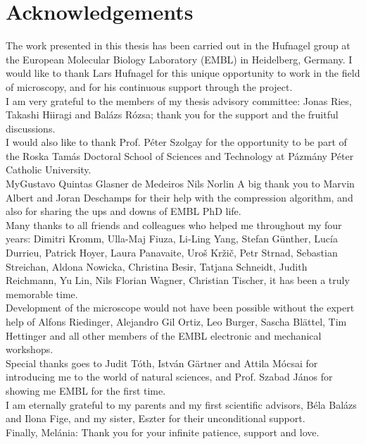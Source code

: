 
\cleardoublepage
\chapter*{Acknowledgements}

The work presented in this thesis has been carried out in the Hufnagel group at the European Molecular Biology Laboratory (EMBL) in Heidelberg, Germany. I would like to thank Lars Hufnagel for this unique opportunity to work in the field of microscopy, and for his continuous support through the project.
\\[1em]
I am very grateful to the members of my thesis advisory committee: Jonas Ries, Takashi Hiiragi and Balázs Rózsa; thank you for the support and the fruitful discussions.
\\[1em]
I would also like to thank Prof. Péter Szolgay for the opportunity to be part of the Roska Tamás Doctoral School of Sciences and Technology at Pázmány Péter Catholic University.
\\[1em]
MyGustavo Quintas Glasner de Medeiros
Nils Norlin
A big thank you to Marvin Albert and Joran Deschamps for their help with the compression algorithm, and also for sharing the ups and downs of EMBL PhD life.
\\[1em]
Many thanks to all friends and colleagues who helped me throughout my four years: 
Dimitri Kromm,
Ulla-Maj Fiuza,
Li-Ling Yang,
Stefan Günther,
Lucía Durrieu,
Patrick Hoyer,
Laura Panavaite,
Uroš Kržič,
Petr Strnad,
Sebastian Streichan,
Aldona Nowicka,
Christina Besir,
Tatjana Schneidt,
Judith Reichmann,
Yu Lin,
Nils Florian Wagner,
Christian Tischer,
it has been a truly memorable time.
\\[1em]
Development of the microscope would not have been possible without the expert help of Alfons Riedinger, Alejandro Gil Ortiz, Leo Burger, Sascha Blättel, Tim Hettinger and all other members of the EMBL electronic and mechanical workshops.
\\[1em]
Special thanks goes to Judit Tóth, István Gärtner and Attila Mócsai for introducing me to the world of natural sciences, and Prof. Szabad János for showing me EMBL for the first time.
\\[1em]
I am eternally grateful to my parents and my first scientific advisors, Béla Balázs and Ilona Fige, and my sister, Eszter for their unconditional support.
\\[1em]
Finally, Melánia: Thank you for your infinite patience, support and love.